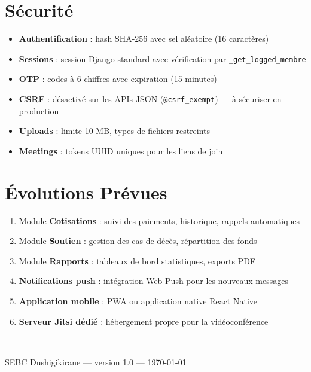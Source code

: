 \documentclass[12pt,a4paper]{article}
\begin{document}
\section{Sécurité}

\begin{itemize}
    \item \textbf{Authentification} : hash SHA-256 avec sel aléatoire (16 caractères)
    \item \textbf{Sessions} : session Django standard avec vérification par \texttt{\_get\_logged\_membre}
    \item \textbf{OTP} : codes à 6 chiffres avec expiration (15 minutes)
    \item \textbf{CSRF} : désactivé sur les APIs JSON (\texttt{@csrf\_exempt}) — à sécuriser en production
    \item \textbf{Uploads} : limite 10 MB, types de fichiers restreints
    \item \textbf{Meetings} : tokens UUID uniques pour les liens de join
\end{itemize}

\section{Évolutions Prévues}

\begin{enumerate}
    \item Module \textbf{Cotisations} : suivi des paiements, historique, rappels automatiques
    \item Module \textbf{Soutien} : gestion des cas de décès, répartition des fonds
    \item Module \textbf{Rapports} : tableaux de bord statistiques, exports PDF
    \item \textbf{Notifications push} : intégration Web Push pour les nouveaux messages
    \item \textbf{Application mobile} : PWA ou application native React Native
    \item \textbf{Serveur Jitsi dédié} : hébergement propre pour la vidéoconférence
\end{enumerate}

\vfill
\begin{center}
\rule{0.5\textwidth}{0.5pt}\\[0.5em]
{\small\color{sebcgray} SEBC Dushigikirane — version 1.0 — \today}
\end{center}
\end{document}
